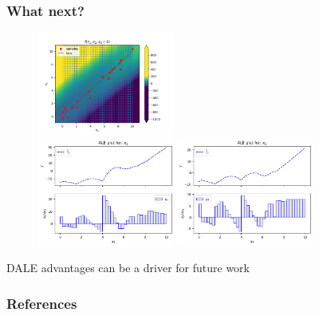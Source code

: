 \documentclass{beamer}
\begin{document}
\begin{frame}
  \frametitle{What next?}
  \begin{figure}[ht]
    \centering
    \includegraphics[width=0.4\textwidth]{./figures/bin_splitting_40_bins.png}\\
    \includegraphics[width=0.4\textwidth]{./figures/dale_40_bins.png}
    \includegraphics[width=0.4\textwidth]{./figures/ale_40_bins.png}
    \label{}
  \end{figure}
  \noindent\makebox[\linewidth]{\rule{\paperwidth}{0.4pt}}
  DALE advantages can be a driver for future work
\end{frame}





\begin{frame}[allowframebreaks]
  \frametitle{References}
  
\end{frame}
\end{document}
